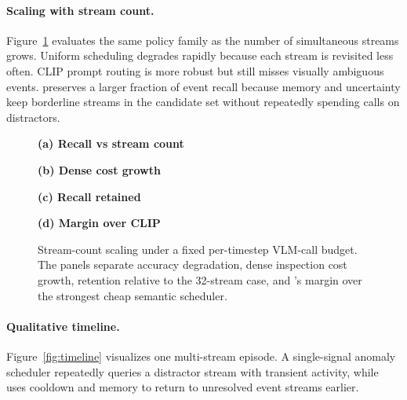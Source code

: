 \paragraph{Scaling with stream count.}
Figure~\ref{fig:stream-scaling} evaluates the same policy family as the number of simultaneous streams grows. Uniform scheduling degrades rapidly because each stream is revisited less often. CLIP prompt routing is more robust but still misses visually ambiguous events. \method{} preserves a larger fraction of event recall because memory and uncertainty keep borderline streams in the candidate set without repeatedly spending calls on distractors.

\begin{figure}[t]
\centering
\begin{minipage}{0.47\linewidth}
\centering
{\scriptsize\textbf{(a) Recall vs stream count}}\\[-0.3em]

\end{minipage}\hfill
\begin{minipage}{0.47\linewidth}
\centering
{\scriptsize\textbf{(b) Dense cost growth}}\\[-0.3em]

\end{minipage}

\vspace{0.35em}
\begin{minipage}{0.47\linewidth}
\centering
{\scriptsize\textbf{(c) Recall retained}}\\[-0.3em]

\end{minipage}\hfill
\begin{minipage}{0.47\linewidth}
\centering
{\scriptsize\textbf{(d) Margin over CLIP}}\\[-0.3em]

\end{minipage}
\caption{Stream-count scaling under a fixed per-timestep VLM-call budget. The panels separate accuracy degradation, dense inspection cost growth, retention relative to the 32-stream case, and \method{}'s margin over the strongest cheap semantic scheduler.}
\label{fig:stream-scaling}
\end{figure}

\paragraph{Qualitative timeline.}
Figure~\ref{fig:timeline} visualizes one multi-stream episode. A single-signal anomaly scheduler repeatedly queries a distractor stream with transient activity, while \method{} uses cooldown and memory to return to unresolved event streams earlier.

